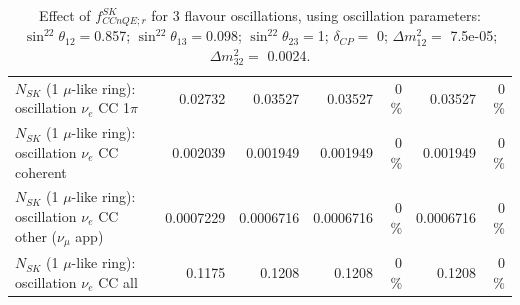 \begin{table}
\begin{tabular}{| l | r | r | r  r | r  r |}
                     $N_{SK}$ (1 $\mu$-like ring): oscillation $\nu_e$ CC 1$\pi$ &         0.02732 &         0.03527 &         0.03527 &        0 \%  &         0.03527 &        0 \%  \\ 
                   $N_{SK}$ (1 $\mu$-like ring): oscillation $\nu_e$ CC coherent &        0.002039 &        0.001949 &        0.001949 &        0 \%  &        0.001949 &        0 \%  \\ 
      $N_{SK}$ (1 $\mu$-like ring): oscillation $\nu_e$ CC other ($\nu_\mu$ app) &       0.0007229 &       0.0006716 &       0.0006716 &        0 \%  &       0.0006716 &        0 \%  \\ 
                       $N_{SK}$ (1 $\mu$-like ring): oscillation $\nu_e$  CC all &          0.1175 &          0.1208 &          0.1208 &        0 \%  &          0.1208 &        0 \%  \\ 
\hline
\hline
\end{tabular}
\caption{ Effect of $f_{CCnQE; r}^{SK}$ for 3 flavour oscillations, using oscillation parameters:  $\sin^22\theta_{12} = $0.857; $\sin^22\theta_{13} = $0.098; $\sin^22\theta_{23} = $1; $\delta_{CP} = $        0; $\Delta m^2_{12} = $    7.5e-05; $\Delta m^2_{32} = $    0.0024. }
\label{tab:num_sk_1Rmu_ccnonqe_eff_1RmuT_3f_osc_t13:0.098}
\end{table}
\clearpage
